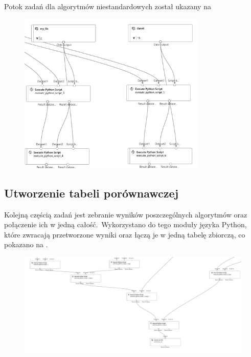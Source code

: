 Potok zadań dla algorytmów niestandardowych został ukazany na 

\begin{figure}[H]
    \centering
    \includegraphics[width=0.8\textwidth]{images/au-pipe}
    \label{fig:au-pipe}
\end{figure}

\subsection{Utworzenie tabeli porównawczej}
Kolejną częścią zadań jest zebranie wyników poszczególnych algorytmów oraz połączenie ich w jedną całość.\ Wykorzystano do tego moduły języka Python, które zwracają przetworzone wyniki oraz łączą je w jedną tabelę zbiorczą, co pokazano na .

\begin{figure}[H]
    \centering
    \includegraphics[width=\textwidth]{images/pipe-csv}
    \label{fig:pipe-4}
\end{figure}


